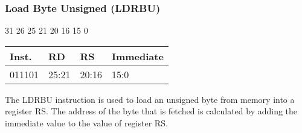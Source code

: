 \documentclass[12pt]{article}
\begin{document}

    \newpage
    \subsubsection{Load Byte Unsigned (LDRBU)}
    
    \hspace{1.6cm}31 \hspace{1.15cm}26 \hspace{.05cm}25 \hspace{.8cm}21 \hspace{.05cm}20 \hspace{.8cm}16 \hspace{.05cm}15 \hspace{6.4cm}0
    \vspace{-.25cm}
    \begin{center}
        \begin{tabular}{ |p{1.8cm}|p{1.5cm}|p{1.5cm}|p{6.8cm}| }
            \hline
            \textbf{Inst.} & \textbf{RD} &  \textbf{RS} & \textbf{Immediate}\\
            \hline
            011101& 25:21 & 20:16 &15:0\\
            \hline
        \end{tabular}
    \end{center}
    
    \noindent
    The LDRBU instruction is used to load an unsigned byte from memory into a register RS. The address of the byte that is fetched is calculated by adding the immediate value to the value of register RS. 
    
\end{document}
